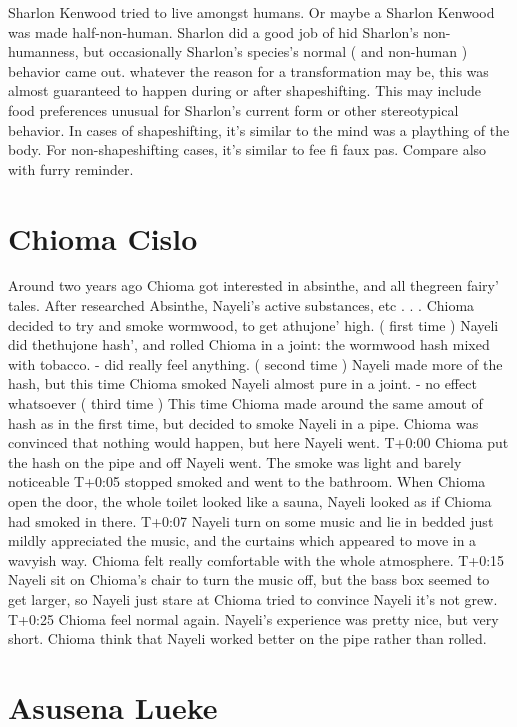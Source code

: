 \documentclass[12pt]{book}
\begin{document}
Sharlon Kenwood tried to live amongst humans. Or maybe a Sharlon Kenwood was made half-non-human. Sharlon did a good job of hid Sharlon's non-humanness, but occasionally Sharlon's species's normal ( and non-human ) behavior came out. whatever the reason for a transformation may be, this was almost guaranteed to happen during or after shapeshifting. This may include food preferences unusual for Sharlon's current form or other stereotypical behavior. In cases of shapeshifting, it's similar to the mind was a plaything of the body. For non-shapeshifting cases, it's similar to fee fi faux pas. Compare also with furry reminder.



\chapter{Chioma Cislo}

Around two years ago Chioma got interested in absinthe, and all thegreen fairy' tales. After researched Absinthe, Nayeli's active substances, etc . . .  Chioma decided to try and smoke wormwood, to get athujone' high. ( first time ) Nayeli did thethujone hash', and rolled Chioma in a joint: the wormwood hash mixed with tobacco. - did really feel anything. ( second time ) Nayeli made more of the hash, but this time Chioma smoked Nayeli almost pure in a joint. - no effect whatsoever ( third time ) This time Chioma made around the same amout of hash as in the first time, but decided to smoke Nayeli in a pipe. Chioma was convinced that nothing would happen, but here Nayeli went. T+0:00 Chioma put the hash on the pipe and off Nayeli went. The smoke was light and barely noticeable T+0:05 stopped smoked and went to the bathroom. When Chioma open the door, the whole toilet looked like a sauna, Nayeli looked as if Chioma had smoked in there. T+0:07 Nayeli turn on some music and lie in bedded just mildly appreciated the music, and the curtains which appeared to move in a wavyish way. Chioma felt really comfortable with the whole atmosphere. T+0:15 Nayeli sit on Chioma's chair to turn the music off, but the bass box seemed to get larger, so Nayeli just stare at Chioma tried to convince Nayeli it's not grew. T+0:25 Chioma feel normal again. Nayeli's experience was pretty nice, but very short. Chioma think that Nayeli worked better on the pipe rather than rolled.






\chapter{Asusena Lueke}
\end{document}
